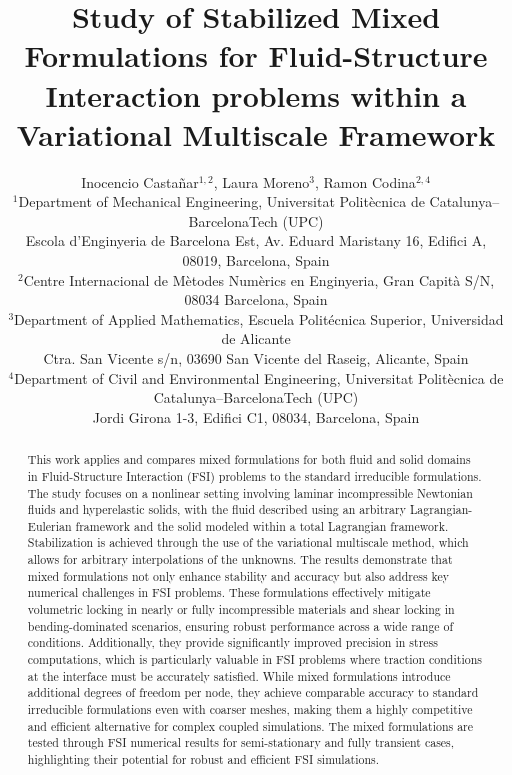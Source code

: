 \documentclass[11pt,english]{article}
\begin{document}
\title{Study of Stabilized Mixed Formulations for Fluid-Structure Interaction problems within a Variational Multiscale Framework}
\author{Inocencio Casta\~nar$^{1,2}$, Laura Moreno$^3$, Ramon Codina$^{2,4}$\\ 
 {\footnotesize{}{}$^{1}$Department of Mechanical Engineering, Universitat Polit\`ecnica de Catalunya--BarcelonaTech (UPC)}\\
 {\footnotesize{}{}Escola d’Enginyeria de Barcelona Est, Av. Eduard Maristany 16, Edifici A, 08019, Barcelona, Spain}\\
 {\footnotesize{}{}$^{2}$Centre Internacional de M\`etodes Num\`erics en Enginyeria, Gran Capit\`a S/N, 08034 Barcelona, Spain}\\
 {\footnotesize{}{}$^{3}$Department of Applied Mathematics, Escuela Politécnica Superior, Universidad de Alicante}\\ 
 {\footnotesize{}{}Ctra. San Vicente s/n, 03690 San Vicente del Raseig, Alicante, Spain}\\
 {\footnotesize{}{}$^{4}$Department of Civil and Environmental Engineering, Universitat Polit\`ecnica de Catalunya--BarcelonaTech (UPC)}\\
 {\footnotesize{}{}Jordi Girona 1-3, Edifici C1, 08034, Barcelona, Spain}
}
\maketitle
\begin{abstract}
This work applies and compares mixed formulations for both fluid and solid domains in Fluid-Structure Interaction (FSI) problems to the standard irreducible formulations. The study focuses on a nonlinear setting involving laminar incompressible Newtonian fluids and hyperelastic solids, with the fluid described using an arbitrary Lagrangian-Eulerian framework and the solid modeled within a total Lagrangian framework. Stabilization is achieved through the use of the variational multiscale method, which allows for arbitrary interpolations of the unknowns. The results demonstrate that mixed formulations not only enhance stability and accuracy but also address key numerical challenges in FSI problems. These formulations effectively mitigate volumetric locking in nearly or fully incompressible materials and shear locking in bending-dominated scenarios, ensuring robust performance across a wide range of conditions. Additionally, they provide significantly improved precision in stress computations, which is particularly valuable in FSI problems where traction conditions at the interface must be accurately satisfied. While mixed formulations introduce additional degrees of freedom per node, they achieve comparable accuracy to standard irreducible formulations even with coarser meshes, making them a highly competitive and efficient alternative for complex coupled simulations. The mixed formulations are tested through FSI numerical results for semi-stationary and fully transient cases, highlighting their potential for robust and efficient FSI simulations.
\end{abstract}
\end{document}
